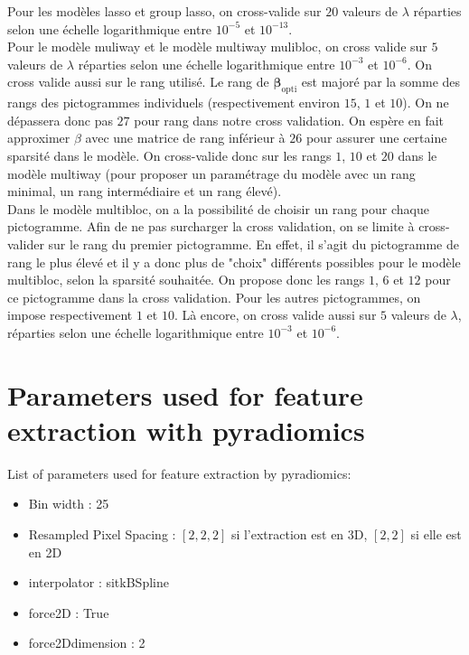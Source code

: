 \documentclass[preprint,12pt]{elsarticle}
\begin{document}
\noindent Pour les modèles lasso et group lasso, on cross-valide sur $20$ valeurs de $\lambda$ réparties selon une échelle logarithmique entre $10^{-5}$ et $10^{-13}$.\\
\indent Pour le modèle muliway et le modèle multiway mulibloc, on cross valide sur $5$ valeurs de $\lambda$ réparties selon une échelle logarithmique entre $10^{-3}$ et $10^{-6}$. On cross valide aussi sur le rang utilisé. Le rang de $\bm{\beta}_{\text{opti}}$ est majoré par la somme des rangs des pictogrammes individuels (respectivement environ $15$, $1$ et $10$). On ne dépassera donc pas $27$ pour rang dans notre cross validation. On espère en fait approximer $\beta$ avec une matrice de rang inférieur à $26$ pour assurer une certaine sparsité dans le modèle. On cross-valide donc sur les rangs $1$, $10$ et $20$ dans le modèle multiway (pour proposer un paramétrage du modèle avec un rang minimal, un rang intermédiaire et un rang élevé).\\
\indent Dans le modèle multibloc, on a la possibilité de choisir un rang pour chaque pictogramme. Afin de ne pas surcharger la cross validation, on se limite à cross-valider sur le rang du premier pictogramme. En effet, il s'agit du pictogramme de rang le plus élevé et il y a donc plus de "choix" différents possibles pour le modèle multibloc, selon la sparsité souhaitée. On propose donc les rangs $1$, $6$ et $12$ pour ce pictogramme dans la cross validation. Pour les autres pictogrammes, on impose respectivement $1$ et $10$. Là encore, on cross valide aussi sur $5$ valeurs de $\lambda$, réparties selon une échelle logarithmique entre $10^{-3}$ et $10^{-6}$.





\newpage

\section{Parameters used for feature extraction with pyradiomics}
\label{annexeparam}

List of parameters used for feature extraction by pyradiomics:
 
\begin{itemize}[label = $\bullet$]
    \item Bin width : 25
    \item Resampled Pixel Spacing : $[2,2,2]$ si l'extraction est en 3D, $[2,2]$ si elle est en 2D
    \item interpolator : sitkBSpline
    \item force2D : True
    \item force2Ddimension : 2
\end{itemize}
\end{document}
